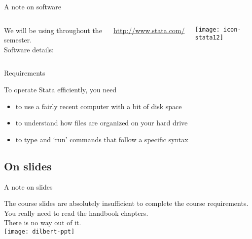 \documentclass[t]{beamer}
\begin{document}
  \begin{frame}[t]{A note on software}
  
    \begin{columns}[T]

      
      We will be using  throughout the semester.\\[1em]   

			Software details:
			
			\url{http://www.stata.com/}


			\begin{center}
				\vspace{-2em}
				\texttt{[image: icon-stata12]}
			\end{center}
			
    \end{columns}
  
      \vspace{1em}
      
      \begin{alertblock}{Requirements}

				To operate Stata efficiently, you need

        \begin{itemize}
					\item to use a fairly recent computer with a bit of disk space
        	\item to understand how files are organized on your hard drive
					\item to type and `run' commands that follow a specific syntax
        \end{itemize}
        
      \end{alertblock}
      
  \end{frame}

  \subsection{On slides}
  
  \begin{frame}[t]{A note on slides}

    The course slides are absolutely insufficient to complete the %
		course requirements. You really need to read the handbook chapters.\\[1em]
		
		There is no way out of it.\\[1em]
      
    \texttt{[image: dilbert-ppt]}

  \end{frame}
\end{document}
